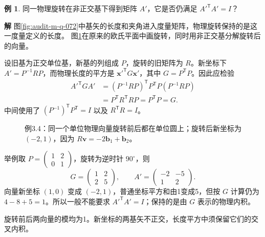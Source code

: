 \documentclass[11pt,openany,fontset=fandol]{ctexbook}
\theoremstyle{plain}\newtheorem{theorem}{定理}[chapter]\newtheorem{proposition}[theorem]{命题}
\theoremstyle{definition}\newtheorem{definition}{定义}[chapter]\newtheorem{example}{例}[chapter]
\theoremstyle{remark}\newtheorem*{remark}{说明}
\newcommand{\SolutionStart}{\par\nobreak\medskip\nobreak\noindent\textbf{解}\quad\ignorespaces}
\newenvironment{solution}{\SolutionStart}{\par\medskip}
\newcommand{\vct}[1]{\bm{#1}}\newcommand{\Rea}{\operatorname{Re}}\newcommand{\Ima}{\operatorname{Im}}
\begin{document}
\begin{example}
同一物理旋转在非正交基下得到矩阵 $A'$，它是否仍满足 $A'^{\mathsf T}A'=I$？
\end{example}

\begin{solution}
图\ref{fig:audit-m-q-072}中基矢的长度和夹角进入度量矩阵，物理旋转保持的是这一度量定义的长度。
图\ref{fig:eg-3-4}在原来的欧氏平面中画旋转，同时用非正交基分解旋转后的向量。

设旧基为正交单位基，新基的列组成 $P$，旋转的旧矩阵为 $R$。新坐标下 $A'=P^{-1}RP$，而物理长度的平方是 $\vct x'^{\mathsf T}G\vct x'$，其中 $G=P^{\mathsf T}P$。因此应检验
\begin{align*}
A'^{\mathsf T}GA'&=(P^{-1}RP)^{\mathsf T}P^{\mathsf T}P(P^{-1}RP)\\
&=P^{\mathsf T}R^{\mathsf T}RP=P^{\mathsf T}P=G.
\end{align*}
中间使用了 $(P^{-1})^{\mathsf T}P^{\mathsf T}=I$ 以及 $R^{\mathsf T}R=I$。

\begin{figure}[H]\centering
{}
\caption{例3.4：同一个单位物理向量旋转前后都在单位圆上；旋转后新坐标为 $(-2,1)$，因为 $R\vct v=-2\vct b_1+\vct b_2$。}\label{fig:eg-3-4}
\end{figure}

举例取 $P=\begin{pmatrix}1&2\\0&1\end{pmatrix}$，旋转为逆时针 $90^\circ$，则
\[
G=\begin{pmatrix}1&2\\2&5\end{pmatrix},\qquad
A'=\begin{pmatrix}-2&-5\\1&2\end{pmatrix}.
\]
向量新坐标 $(1,0)$ 变成 $(-2,1)$，普通坐标平方和由1变成5，但按 $G$ 计算仍为 $4-8+5=1$。所以一般不能要求 $A'^{\mathsf T}A'=I$；保持的是由 $G$ 表示的物理内积。

旋转前后两向量的模均为1。新坐标的两基矢不正交，长度平方中须保留它们的交叉内积。
\end{solution}
\end{document}

